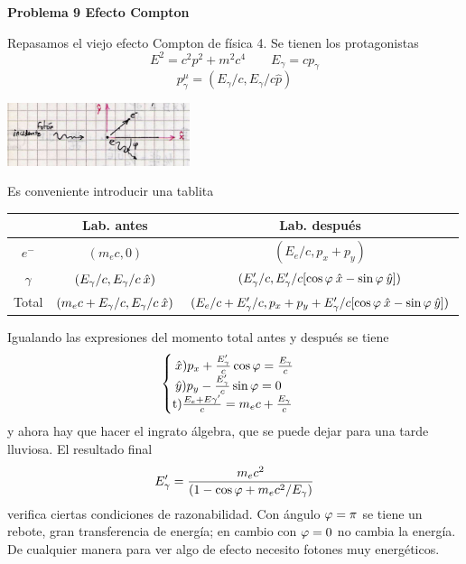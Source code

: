 \documentclass[10pt,oneside]{CBFT_book}
\begin{document}
\begin{ejemplo}{\bf Problema 9 Efecto Compton}

Repasamos el viejo efecto Compton de física 4. Se tienen los protagonistas
\[
	E^2 = c^2 p^2 + m^2 c^4 \qquad E_\gamma = c p_\gamma
\]
\[
	p_\gamma^\mu = ( E_\gamma/c, E_\gamma/c \hat{p} )
\]

\includegraphics[width=0.4\textwidth]{images/fig_ft1_sr_problema9.jpg}

Es conveniente introducir una tablita

\begin{center}
\begin{tabular}{ccc}
 & Lab. antes & Lab. después \\
\hline 
$e^-$ 		& $( m_e c, 0)$ 	& $( E_e/c, p_x + p_y )$ \\
$\gamma$	& $( E_\gamma/c,E_\gamma/c \:\hat{x} )$ &  $( E_\gamma'/c,E_\gamma'/c [ \cos\varphi\:\hat{x} - \sin\varphi\:\hat{y}] )$ \\
\hline
Total & $( m_e c + E_\gamma/c,E_\gamma/c \:\hat{x} )$ & 
$( E_e/c + E_\gamma'/c, p_x + p_y + E_\gamma'/c [ \cos\varphi\:\hat{x} - \sin\varphi\:\hat{y}] )$\\
\end{tabular}
\end{center}

Igualando las expresiones del momento total antes y después se tiene
\[
	\begin{cases}
	\xver) p_x + \frac{E_\gamma'}{c} \cos\vp = \frac{E_\gamma}{c} \\
	\yver) p_y - \frac{E_\gamma'}{c} \sin\vp = 0 \\
	$t$) \frac{E_e + E\gamma'}{c} = m_e c + \frac{E_\gamma}{c}
	\end{cases}
\]
y ahora hay que hacer el ingrato álgebra, que se puede dejar para una tarde lluviosa.
El resultado final
\[
	E_\gamma' = \frac{ m_e c^2 }{\left( 1 - \cos\varphi + m_e c^2 /E_\gamma \right)}
\]
verifica ciertas condiciones de razonabilidad. Con ángulo $\varphi=\pi$ se tiene un rebote,
gran transferencia de energía; en cambio con $\varphi=0$ no cambia la energía.
De cualquier manera para ver algo de efecto necesito fotones muy energéticos.

\end{ejemplo}




\end{document}
